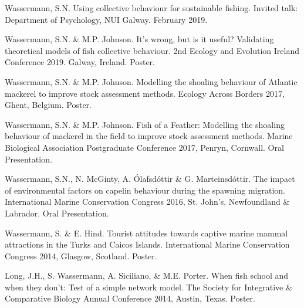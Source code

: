 \documentclass[a4paper]{deedy-resume} %
\begin{document}
\begin{flushleft}
\begin{tightitemize}
\item Wassermann, S.N. Using collective behaviour for sustainable fishing. Invited talk: Department of Psychology, NUI Galway. February 2019.
\item Wassermann, S.N. \& M.P. Johnson. It's wrong, but is it useful? Validating theoretical models of fish collective behaviour. 2nd Ecology and Evolution Ireland Conference 2019. Galway, Ireland. Poster.
\item Wassermann, S.N. \& M.P. Johnson. Modelling the shoaling behaviour of Atlantic mackerel to improve stock assessment methods. Ecology Across Borders 2017, Ghent, Belgium. Poster.
\item Wassermann, S.N. \& M.P. Johnson. Fish of a Feather: Modelling the shoaling behaviour of mackerel in the field to improve stock assessment methods. Marine Biological Association Postgraduate Conference 2017, Penryn, Cornwall. Oral Presentation.
\item Wassermann, S.N., N. McGinty, A. \'{O}lafsd\'{o}ttir \& G. Marteinsd\'{o}ttir. The impact of environmental factors on capelin behaviour during the spawning migration. International Marine Conservation Congress 2016, St. John's, Newfoundland \& Labrador. Oral Presentation.
\item Wassermann, S. \& E. Hind. Tourist attitudes towards captive marine mammal attractions in the Turks and Caicos Islands. International Marine Conservation Congress 2014, Glasgow, Scotland. Poster.
\item Long, J.H., S. Wassermann, A. Siciliano, \& M.E. Porter. When fish school and when they don't: Test of a simple network model. The Society for Integrative \& Comparative Biology Annual Conference 2014, Austin, Texas. Poster.
\end{tightitemize}

\sectionspace


\end{flushleft}



\newpage %


\sectionspace
\end{document}

